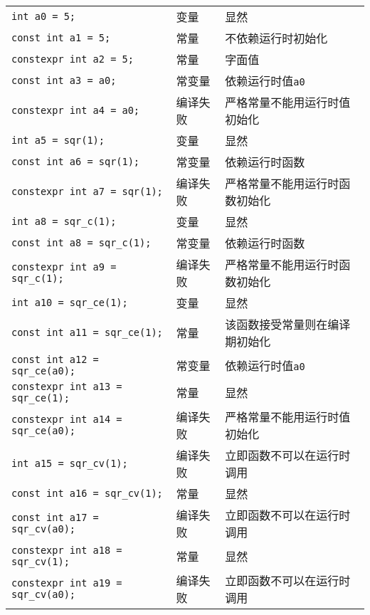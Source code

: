 \begin{tip}
\begin{small}
\begin{longtable}[c]{lll}
  \texttt{int a0 = 5;} & 变量 & 显然 \\
  \rowcolor{blue!15}\texttt{const int a1 = 5;} & 常量 & 不依赖运行时初始化 \\
  \texttt{constexpr int a2 = 5;} & 常量 & 字面值 \\
  \texttt{const int a3 = a0;} & 常变量 & 依赖运行时值\texttt{a0} \\
  \rowcolor{red!15}\texttt{constexpr int a4 = a0;} & 编译失败 & 严格常量不能用运行时值初始化 \\
  \texttt{int a5 = sqr(1);} & 变量 & 显然 \\
  \texttt{const int a6 = sqr(1);} & 常变量 & 依赖运行时函数 \\
  \rowcolor{red!15}\texttt{constexpr int a7 = sqr(1);} & 编译失败 & 严格常量不能用运行时函数初始化 \\
  \texttt{int a8 = sqr\_c(1);} & 变量 & 显然 \\
  \texttt{const int a8 = sqr\_c(1);} & 常变量 & 依赖运行时函数 \\
  \rowcolor{red!15}\texttt{constexpr int a9 = sqr\_c(1);} & 编译失败 & 严格常量不能用运行时函数初始化 \\
  \texttt{int a10 = sqr\_ce(1);} & 变量 & 显然 \\
  \rowcolor{blue!15}\texttt{const int a11 = sqr\_ce(1);} & 常量 & 该函数接受常量则在编译期初始化 \\
  \texttt{const int a12 = sqr\_ce(a0);} & 常变量 & 依赖运行时值\texttt{a0} \\
  \texttt{constexpr int a13 = sqr\_ce(1);} & 常量 & 显然 \\
  \rowcolor{red!15}\texttt{constexpr int a14 = sqr\_ce(a0);} & 编译失败 & 严格常量不能用运行时值初始化 \\
  \rowcolor{red!15}\texttt{int a15 = sqr\_cv(1);} & 编译失败 & 立即函数不可以在运行时调用 \\
  \rowcolor{blue!15}\texttt{const int a16 = sqr\_cv(1);} & 常量 & 显然 \\
  \rowcolor{red!15}\texttt{const int a17 = sqr\_cv(a0);} & 编译失败 & 立即函数不可以在运行时调用 \\
  \texttt{constexpr int a18 = sqr\_cv(1);} & 常量 & 显然 \\
  \rowcolor{red!15}\texttt{constexpr int a19 = sqr\_cv(a0);} & 编译失败 & 立即函数不可以在运行时调用 \\
\end{longtable}
\end{small}
\end{tip}

